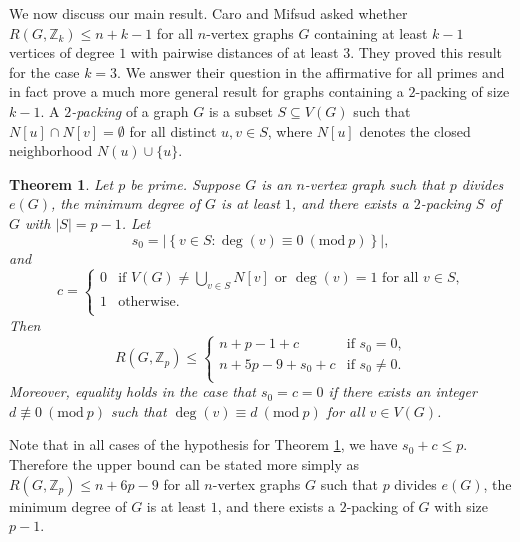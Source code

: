 \documentclass[11pt]{article}
\newcommand{\bZ}{\mathbb{Z}}
\newcommand\set[1]{\left\{ #1 \right\}}
\newcommand\abs[1]{\left\lvert #1 \right\rvert}
\newcommand\mmod[1]{\ (\mathrm{mod}\ #1)}
\theoremstyle{definition}
\theoremstyle{plain}
\newtheorem{thm}{Theorem}
\begin{document}
We now discuss our main result. Caro and Mifsud \cite{mod3} asked whether $R(G,\bZ_k)\leq n+k-1$ for all $n$-vertex graphs $G$ containing at least $k-1$ vertices of degree $1$ with pairwise distances of at least $3$. They proved this result for the case $k=3$. We answer their question in the affirmative for all primes and in fact prove a much more general result for graphs containing a $2$-packing of size $k-1$.  
A \textit{$2$-packing} of a graph $G$ is a subset $S\subseteq V(G)$ such that $N[u]\cap N[v]=\emptyset$ for all distinct $u,v\in S$, where $N[u]$ denotes the closed neighborhood $N(u)\cup\{u\}$.
\begin{thm}
    Let $p$ be prime. Suppose $G$ is an $n$-vertex graph such that $p$ divides $e(G)$, the minimum degree of $G$ is at least $1$, and there exists a $2$-packing $S$ of $G$ with $\abs{S}=p-1$. Let
    \begin{equation*}
        s_0=\abs{\set{v\in S:\deg(v)\equiv 0\mmod{p}}},
    \end{equation*}
    and
    \begin{equation*}
        c=\begin{cases}
            0 & \mbox{if $V(G)\neq \bigcup_{v\in S}N[v]$ or $\deg(v)=1$ for all $v\in S$,}\\
            1 & \mbox{otherwise.}\\
        \end{cases}
    \end{equation*}
    Then
    \begin{equation*}
        R(G,\bZ_p)\leq \begin{cases}
            n+p-1+c & \mbox{if $s_0=0$,}\\
            n+5p-9+s_0+c & \mbox{if $s_0\neq 0$.}\\
        \end{cases}
    \end{equation*}
    Moreover, equality holds in the case that $s_0=c=0$ if there exists an integer $d\not\equiv 0\mmod{p}$ such that $\deg(v)\equiv d\mmod{p}$ for all $v\in V(G)$.
    \label{thm:main}
\end{thm}
Note that in all cases of the hypothesis for Theorem \ref{thm:main}, we have $s_0+c\leq p$. Therefore the upper bound can be stated more simply as $R(G,\bZ_p)\leq n+6p-9$ for all $n$-vertex graphs $G$ such that $p$ divides $e(G)$, the minimum degree of $G$ is at least $1$, and there exists a $2$-packing of $G$ with size $p-1$. 
\end{document}
